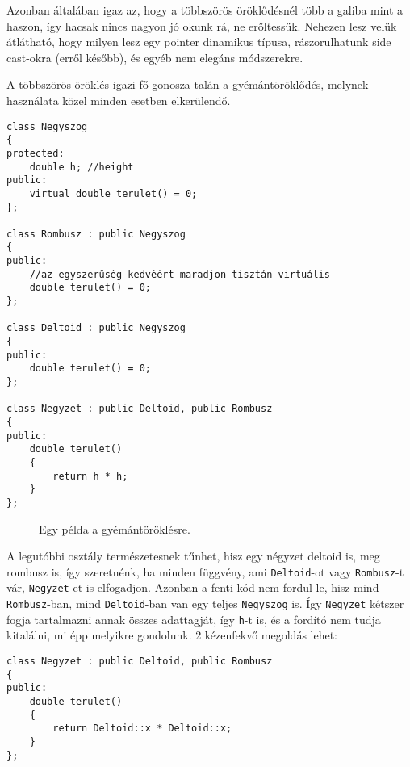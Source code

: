 \documentclass[a4paper,11.5pt,table]{article}
\begin{document}
	Azonban általában igaz az, hogy a többszörös öröklődésnél több a galiba mint a haszon, így hacsak nincs nagyon jó okunk rá, ne erőltessük. Nehezen lesz velük átlátható, hogy milyen lesz egy pointer dinamikus típusa, rászorulhatunk side cast-okra (erről később), és egyéb nem elegáns módszerekre.
	
	\medskip
	A többszörös öröklés igazi fő gonosza talán a gyémántöröklődés, melynek használata közel minden esetben elkerülendő.
	\begin{lstlisting}
class Negyszog 
{
protected:
	double h; //height
public:
	virtual double terulet() = 0;
};

class Rombusz : public Negyszog
{
public:
	//az egyszerűség kedvéért maradjon tisztán virtuális
	double terulet() = 0; 
};

class Deltoid : public Negyszog
{
public:
	double terulet() = 0;
};

class Negyzet : public Deltoid, public Rombusz
{
public:
	double terulet()
	{
		return h * h;
	}
};
	\end{lstlisting}
	\begin{figure}
		\centering
		
		\smallskip
		Egy példa a gyémántöröklésre.
	\end{figure}
	A legutóbbi osztály természetesnek tűnhet, hisz egy négyzet deltoid is, meg rombusz is, így szeretnénk, ha minden függvény, ami \texttt{Deltoid}-ot vagy \texttt{Rombusz}-t vár, \texttt{Negyzet}-et is elfogadjon. Azonban a fenti kód nem fordul le, hisz mind \texttt{Rombusz}-ban, mind \texttt{Deltoid}-ban van egy teljes \texttt{Negyszog} is. Így \texttt{Negyzet} kétszer fogja tartalmazni annak összes adattagját, így \texttt{h}-t is, és a fordító nem tudja kitalálni, mi épp melyikre gondolunk. 2 kézenfekvő megoldás lehet:
	\begin{lstlisting}
class Negyzet : public Deltoid, public Rombusz
{
public:
	double terulet()
	{
		return Deltoid::x * Deltoid::x;
	}
};
	\end{lstlisting}
\end{document}
